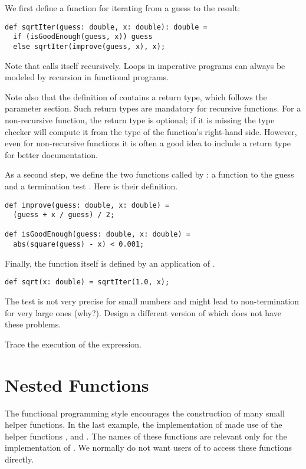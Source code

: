 We first define a function for iterating from a guess to the result:
\begin{lstlisting}
def sqrtIter(guess: double, x: double): double = 
  if (isGoodEnough(guess, x)) guess
  else sqrtIter(improve(guess, x), x);
\end{lstlisting}
Note that  calls itself recursively.  Loops in
imperative programs can always be modeled by recursion in functional
programs. 

Note also that the definition of  contains a return
type, which follows the parameter section. Such return types are
mandatory for recursive functions. For a non-recursive function, the
return type is optional; if it is missing the type checker will
compute it from the type of the function's right-hand side. However,
even for non-recursive functions it is often a good idea to include a
return type for better documentation.

As a second step, we define the two functions called by
: a function to  the guess and a
termination test . Here is their definition.
\begin{lstlisting}
def improve(guess: double, x: double) = 
  (guess + x / guess) / 2;

def isGoodEnough(guess: double, x: double) = 
  abs(square(guess) - x) < 0.001;
\end{lstlisting}

Finally, the  function itself is defined by an application
of .
\begin{lstlisting}
def sqrt(x: double) = sqrtIter(1.0, x);
\end{lstlisting}

\begin{exercise} The  test is not very precise for small
numbers and might lead to non-termination for very large ones (why?).
Design a different version of  which does not have
these problems.
\end{exercise}

\begin{exercise} Trace the execution of the  expression.
\end{exercise}

\section{Nested Functions}

The functional programming style encourages the construction of many
small helper functions. In the last example, the implementation
of  made use of the helper functions ,
 and . The names of these functions
are relevant only for the implementation of . We normally
do not want users of  to access these functions directly.

